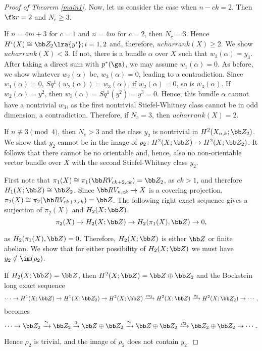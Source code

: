 \begin{proof}[Proof of Theorem \ref{main1}]
Now, let us consider the case when $n-ck=2$. Then $\fk r=2$ and $N_c\ge 3$.

If $n=4m+3$ for $c=1$ and $n=4m$ for $c=2$, then $N_c=3$. Hence $H^i(X)\cong \bb Z_2\lra{y^i}; i=1, 2$ and, therefore, $ucharrank(X)\geq 2$. We show $ucharrank(X)<3$. If not, there is a bundle $\alpha$ over $X$ such that $w_3(\alpha) = y_3$. After taking a direct sum with $p^*(\ga)$, we may assume $w_1(\alpha)=0$. As before, we show whatever $w_2(\alpha)$ be, $w_3(\alpha)=0$, leading to a contradiction. Since $w_1(\alpha)=0$, $Sq^1(w_2(\alpha))=w_3(\alpha)$, if $w_2(\alpha)=0$, so is $w_3(\alpha).$ If $w_2(\alpha)=y^2$, then $w_3(\alpha)=Sq^1(y^2)=y^3=0.$ Hence, this bundle $\alpha$ cannot have a nontrivial $w_3$, as the first nontrivial Stiefel-Whitney class cannot be in odd dimension, a contradiction. Therefore, if $N_c=3$, then $ucharrank(X)=2$.




If  $n\not\equiv 3\pmod 4$, then $N_c>3$ and the class $y_{2}$ is nontrivial in $H^2(X_{n,k}; \bb Z_2)$. We show that $y_2$ cannot be in the image of $\rho_2\colon H^2(X;\bb Z)\to H^2(X;\bb Z_2)$. It follows that there cannot be no orientable and, hence, also no non-orientable vector bundle over $X$ with the second Stiefel-Whitney class $y_2$.


First note that $\pi_1(X)\cong \pi_1(\bb RV_{ck+2,ck})=\bb Z_2$, as $ck>1$, and therefore $H_1(X; \bb Z)\cong \bb Z_2$. Since $\bb RV_{n,ck}\to X$ is a covering projection, $\pi_2(X)\cong \pi_2(\bb RV_{ck+2,ck})=\bb Z$. The following right exact sequence gives a surjection of $\pi_2(X)$ and $ H_2(X; \bb Z)$.
\[\pi_2(X)\to H_2(X; \bb Z)\to H_2(\pi_1(X), \bb Z)\to 0,\]

as $H_2(\pi_1(X), \bb Z)=0$. Therefore, $H_2(X; \bb Z)$ is either $\bb Z$ or finite abelian. We show that for either possibility of $H_2(X; \bb Z)$ we must have $y_2\notin\im(\rho_2)$.

If $H_2(X; \bb Z)=\bb Z$, then $H^2(X; \bb Z)=\bb Z\oplus\bb Z_2$ and the Bockstein long exact sequence
\[ \cdots\rightarrow H^1(X; \bb Z)\xrightarrow{} H^1(X; \bb Z_2)\xrightarrow{} H^2(X; \bb Z)\xrightarrow{m_2} H^2(X; \bb Z) \xrightarrow{\rho_2} H^2(X; \bb Z_2)\rightarrow\cdots,\]
becomes
\[ \cdots\to \bb Z_2\xrightarrow{\cong}  \bb Z_2\xrightarrow{0} \bb Z\oplus \bb Z_2\xrightarrow{\cong}  \bb Z\oplus \bb Z_2 \xrightarrow{\rho_2}  \bb Z_2\oplus\bb Z_2\rightarrow\cdots.\]

Hence $\rho_2$ is trivial, and the image of $\rho_2$ does not contain $y_2$.


\end{proof}
